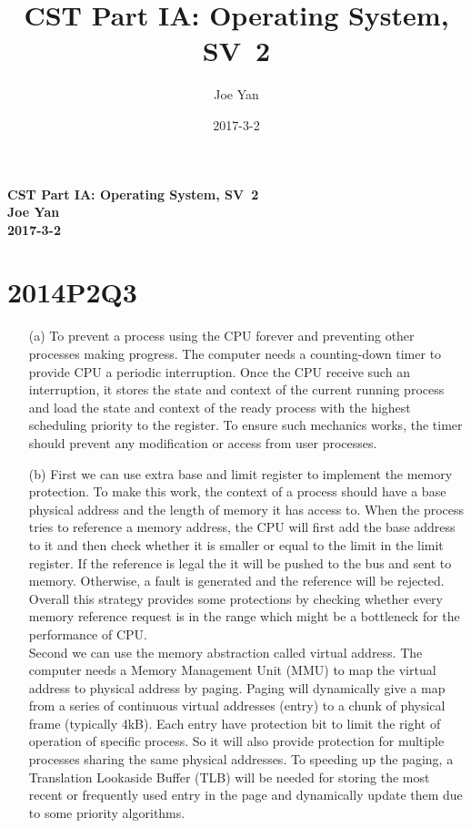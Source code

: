 \documentclass[10pt,twoside,a4paper]{article}
\newcommand{\studentname}{Joe Yan}
\newcommand{\svworkdate}{2017-3-2}
\newcommand{\svcourse}{CST Part IA: Operating System}
\newcommand{\svnumber}{2}
\begin{document}
\author{\studentname}
\title{\svcourse, SV~\svnumber}
\date{\svworkdate}

\textbf{\svcourse, SV~\svnumber}\\
\textbf{\studentname}\\
\textbf{\svworkdate}\\

\section{2014P2Q3}
\begin{itemize}
\item[(a)]
To prevent a process using the CPU forever and preventing other processes making progress. The computer needs a counting-down timer to provide CPU a periodic interruption. Once the CPU receive such an interruption, it stores the state and context of the current running process and load the state and context of the ready process with the highest scheduling priority to the register. To ensure such mechanics works, the timer should prevent any modification or access from user processes.
\item[(b)]
First we can use extra base and limit register to implement the memory protection. To make this work, the context of a process should have a base physical address and the length of memory it has access to. When the process tries to reference a memory address, the CPU will first add the base address to it and then check whether it is smaller or equal to the limit in the limit register. If the reference is legal the it will be pushed to the bus and sent to memory. Otherwise, a fault is generated and the reference will be rejected. Overall this strategy provides some protections by checking whether every memory reference request is in the range which might be a bottleneck for the performance of CPU.
\\Second we can use the memory abstraction called virtual address. The computer needs a Memory Management Unit (MMU) to map the virtual address to physical address by paging. Paging will dynamically give a map from a series of continuous virtual addresses (entry) to a chunk of physical frame (typically 4kB). Each entry have protection bit to limit the right of operation of specific process. So it will also provide protection for multiple processes sharing the same physical addresses. To speeding up the paging, a Translation Lookaside Buffer (TLB) will be needed for storing the most recent or frequently used entry in the page and dynamically update them due to some priority algorithms.

\end{itemize}
\end{document}
